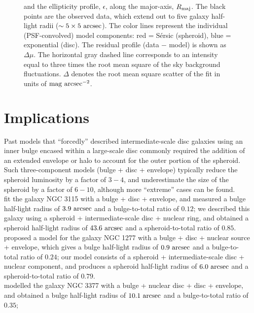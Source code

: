 \documentclass[useAMS,usenatbib,article]{mn2e}
\begin{document}
\begin{figure}
\begin{center}
{and the ellipticity profile, $\epsilon$, 
along the major-axis, $R_{\rm maj}$. 
The black points are the observed data, which extend out to five galaxy half-light radii ($\sim 5 \times 5~\rm arcsec$).
The color lines represent the individual (PSF-convolved) model components: 
red = S\'ersic (spheroid), blue = exponential (disc). 
The residual profile (data $-$ model) is shown as $\Delta \mu$. 
The horizontal gray dashed line corresponds to an intensity equal to three times the root mean square of the sky background fluctuations. 
$\Delta$ denotes the root mean square scatter of the fit in units of $\rm mag~arcsec^{-2}$.
}
\label{fig:m1216}
\end{center}
\end{figure}



\section{Implications}
\label{sec:impl}
Past models that ``forcedly'' described intermediate-scale disc galaxies using an inner bulge 
encased within a large-scale disc 
commonly required the addition of an extended envelope or halo to account for the outer portion of the spheroid. 
Such three-component models (bulge + disc + envelope) typically reduce the spheroid luminosity by a factor of $3-4$, 
and underestimate the size of the spheroid by a factor of $6-10$, 
although more ``extreme'' cases can be found. \\
\cite{lasker2014data} fit the galaxy NGC 3115 with a bulge + disc + envelope, 
and measured a bulge half-light radius of $3.9~\rm arcsec$ and a bulge-to-total ratio of $0.12$; 
we described this galaxy using a spheroid + intermediate-scale disc + nuclear ring, 
and obtained a spheroid half-light radius of $43.6~\rm arcsec$ and a spheroid-to-total ratio of $0.85$. \\
\cite{vandenbosch2012} proposed a model for the galaxy NGC 1277 with a bulge + disc + nuclear source + envelope, 
which gives a bulge half-light radius of $0.9~\rm arcsec$ and a bulge-to-total ratio of $0.24$; 
our model consists of a spheroid + intermediate-scale disc + nuclear component, 
and produces a spheroid half-light radius of $6.0~\rm arcsec$ and a spheroid-to-total ratio of $0.79$. \\
\cite{lasker2014data} modelled the galaxy NGC 3377 with a bulge + nuclear disc + disc + envelope, 
and obtained a bulge half-light radius of $10.1~\rm arcsec$ and a bulge-to-total ratio of $0.35$; 
\end{document}
